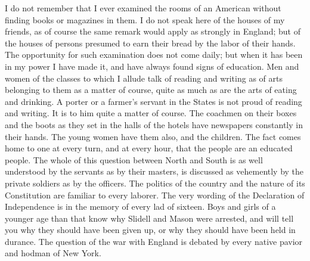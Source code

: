 I do not remember that I ever examined the rooms of an American
without finding books or magazines in them.  I do not speak here of
the houses of my friends, as of course the same remark would apply
as strongly in England; but of the houses of persons presumed to
earn their bread by the labor of their hands.  The opportunity for
such examination does not come daily; but when it has been in my
power I have made it, and have always found signs of education.
Men and women of the classes to which I allude talk of reading and
writing as of arts belonging to them as a matter of course, quite
as much as are the arts of eating and drinking.  A porter or a
farmer's servant in the States is not proud of reading and writing.
It is to him quite a matter of course.  The coachmen on their boxes
and the boots as they set in the halls of the hotels have
newspapers constantly in their hands.  The young women have them
also, and the children.  The fact comes home to one at every turn,
and at every hour, that the people are an educated people.  The
whole of this question between North and South is as well
understood by the servants as by their masters, is discussed as
vehemently by the private soldiers as by the officers.  The
politics of the country and the nature of its Constitution are
familiar to every laborer.  The very wording of the Declaration of
Independence is in the memory of every lad of sixteen.  Boys and
girls of a younger age than that know why Slidell and Mason were
arrested, and will tell you why they should have been given up, or
why they should have been held in durance.  The question of the war
with England is debated by every native pavior and hodman of New
York.


